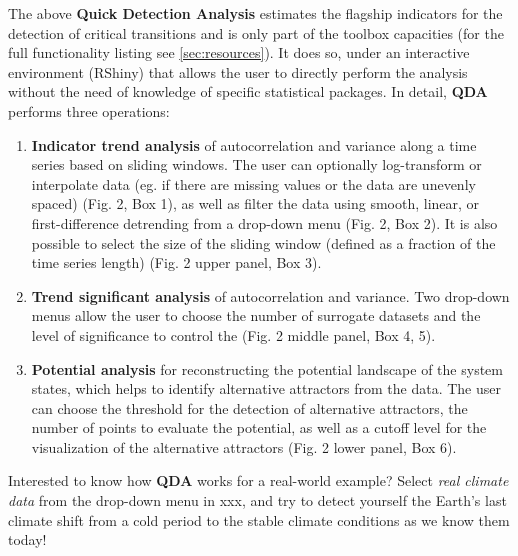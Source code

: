 \documentclass[12pt,a4paper,final]{article}
\begin{document}
The above \textbf{Quick Detection Analysis} estimates the flagship indicators for the detection of critical transitions and is only part of the toolbox capacities (for the full functionality listing see \ref{sec:resources}). It does so, under an interactive environment (RShiny) that allows the user to directly perform the analysis without the need of knowledge of specific statistical packages.
In detail, \textbf{QDA} performs three operations:
\begin{enumerate}
\item \textbf{Indicator trend analysis} of autocorrelation and variance along a time series based on sliding windows. The user can optionally log-transform or interpolate data (eg. if there are missing values or the data are unevenly spaced) (Fig. 2, Box 1), as well as filter the data using smooth, linear, or first-difference detrending from a drop-down menu (Fig. 2, Box 2). It is also possible to select the size of the sliding window (defined as a fraction of the time series length) (Fig. 2 upper panel, Box 3).
\item \textbf{Trend significant analysis} of autocorrelation and variance. Two drop-down menus allow the user to choose the number of surrogate datasets and the level of significance to control the  (Fig. 2 middle panel, Box 4, 5). 
\item \textbf{Potential analysis} for reconstructing the potential landscape of the system states, which helps to identify alternative attractors from the data. The user can choose the threshold for the detection of alternative attractors, the number of points to evaluate the potential, as well as a cutoff level for the visualization of the alternative attractors (Fig. 2 lower panel, Box 6).
\end{enumerate}

Interested to know how \textbf{QDA} works for a real-world example? Select \textit{real climate data} from the drop-down menu in xxx, and try to detect yourself the Earth's last climate shift from a cold period to the stable climate conditions as we know them today!

\end{document}
